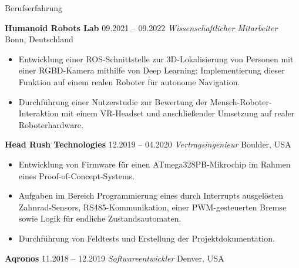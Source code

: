 \begin{rubric}{Berufserfahrung}

%
%
\entry*[] \textbf{Humanoid Robots Lab} \hfill 09.2021 -- 09.2022 \newline  
 \emph{Wissenschaftlicher Mitarbeiter} \hfill Bonn, Deutschland \newline  
\vspace{\CVItemizeHeaderSpacing} \begin{itemize}[leftmargin=*, rightmargin=1cm]
	\setlength{\itemsep}{\CVItemizeSpacing}  
	\item Entwicklung einer ROS-Schnittstelle zur 3D-Lokalisierung von Personen mit einer RGBD-Kamera mithilfe von Deep Learning; Implementierung dieser Funktion auf einem realen Roboter für autonome Navigation. 
	\item Durchführung einer Nutzerstudie zur Bewertung der Mensch-Roboter-Interaktion mit einem VR-Headset und anschließender Umsetzung auf realer Roboterhardware.  
\end{itemize}
%
%
\entry*[] \textbf{Head Rush Technologies} \hfill 12.2019 -- 04.2020 \newline  
 \emph{Vertragsingenieur} \hfill Boulder, USA \newline  
\vspace{\CVItemizeHeaderSpacing} \begin{itemize}[leftmargin=*, rightmargin=1cm]
	\setlength{\itemsep}{\CVItemizeSpacing}  
	\item Entwicklung von Firmware für einen ATmega328PB-Mikrochip im Rahmen eines Proof-of-Concept-Systems.
	\item Aufgaben im Bereich Programmierung eines durch Interrupts ausgelösten Zahnrad-Sensors, RS485-Kommunikation, einer PWM-gesteuerten Bremse sowie Logik für endliche Zustandsautomaten.  
	\item Durchführung von Feldtests und Erstellung der Projektdokumentation.  
\end{itemize}
%
%
\entry*[] \textbf{Aqronos} \hfill 11.2018 -- 12.2019 \newline  
\emph{Softwareentwickler} \hfill Denver, USA \newline  

\end{rubric}

